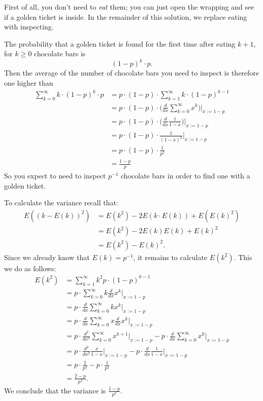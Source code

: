 \documentclass{article}
\begin{document}
\begin{ex}
First of all, you don't need to \emph{eat} them; you can just open the wrapping and
see if a golden ticket is inside. In the remainder of this solution, we replace
eating with inspecting.

The probability that a golden ticket is found for the first time after eating
$k+1$, for $k\geq 0$ chocolate bars is
\begin{equation*}
(1-p)^k\cdot p.
\end{equation*}
Then the average of the number of chocolate bars you need to inspect is therefore
one higher than
\begin{align*}
\sum_{k=0}^\infty k\cdot (1-p)^k\cdot p
& =
  p\cdot (1-p)\cdot \sum_{k=1}^\infty k\cdot (1-p)^{k-1}
  \\
& =
  p\cdot (1-p)\cdot\Big(\frac{d}{dx}\sum_{k=0}^\infty x^k\Big)\Big|_{x:= 1-p}
  \\
& =
  p\cdot (1-p)\cdot\Big(\frac{d}{dx}\frac{1}{1-x}\Big)\Big|_{x:= 1-p}
  \\
& =
  p\cdot (1-p)\cdot\frac{1}{(1-x)^2}\Big|_{x:= 1-p}
  \\
& =
  p\cdot (1-p)\cdot\frac{1}{p^2}
  \\
& = 
  \frac{1-p}{p}
\end{align*}
So you expect to need to inspect $p^{-1}$ chocolate bars in order to find
one with a golden ticket.

To calculate the variance recall that:
\begin{align*}
E((k-E(k))^2) & =E(k^2)-2E(k\cdot E(k))+E(E(k)^2)
  \\
& = E(k^2)-2E(k)E(k)+E(k)^2
  \\
& =E(k^2)-E(k)^2.
\end{align*}
Since we already know that $E(k)=p^{-1}$, it remains to calculate $E(k^2)$. This we do as follows:
\begin{align*}
E(k^2) 
& = 
  \sum_{k=1}^\infty k^2 p\cdot (1-p)^{k-1}
  \\
& = 
  p\cdot\sum_{k=0}^\infty k\frac{d}{dx} x^k\Big|_{x:=1-p}
  \\
& =
  p\cdot\frac{d}{dx}\sum_{k=0}^\infty k x^k\Big|_{x:=1-p}
  \\
& =
  p\cdot\frac{d}{dx}\sum_{k=0}^\infty x\frac{d}{dx}x^k\Big|_{x:=1-p}
  \\
& =
  p\cdot\frac{d^2}{dx^2}\sum_{k=0}^\infty x^{k+1}\Big|_{x:=1-p}
  -p\cdot\frac{d}{dx}\sum_{k=0}^\infty x^k\Big|_{x:=1-p}
  \\
& =
  p\cdot\frac{d^2}{dx^2}\frac{x}{1-x}\Big|_{x:=1-p}
  -p\cdot\frac{d}{dx}\frac{1}{1-x}\Big|_{x:=1-p}
  \\
& =
  p\cdot \frac{2}{p^3}
  -p\cdot\frac{1}{p^2}
  \\
& = 
  \frac{2-p}{p^2}.
\end{align*}
We conclude that the variance is $\frac{1-p}{p^2}$.
\end{ex}
\end{document}
